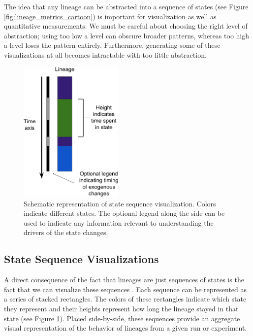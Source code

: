 \documentclass[letterpaper]{article}
\begin{document}
The idea that any lineage can be abstracted into a sequence of states (see Figure \ref{fig:lineage_metrics_cartoon}) is important for visualization as well as quantitative measurements. We must be careful about choosing the right level of abstraction; using too low a level can obscure broader patterns, whereas too high a level loses the pattern entirely. Furthermore, generating some of these visualizations at all becomes intractable with too little abstraction. 


\begin{figure}
    \centering
    \includegraphics[width=2in]{figs/StateSequenceSchematic.png}
    \caption{\small Schematic representation of state sequence visualization. Colors indicate different states. The optional legend along the side can be used to indicate any information relevant to understanding the drivers of the state changes.}
    \label{fig:stateseqschematic}
\end{figure}

\subsection{State Sequence Visualizations}

A direct consequence of the fact that lineages are just sequences of states is the fact that we can visualize these sequences \citep{lalejini_evolutionary_2016}. Each sequence can be represented as a series of stacked rectangles. The colors of these rectangles indicate which state they represent and their heights represent how long the lineage stayed in that state (see Figure \ref{fig:stateseqschematic}). Placed side-by-side, these sequences provide an aggregate visual representation of the behavior of lineages from a given run or experiment.
\end{document}
